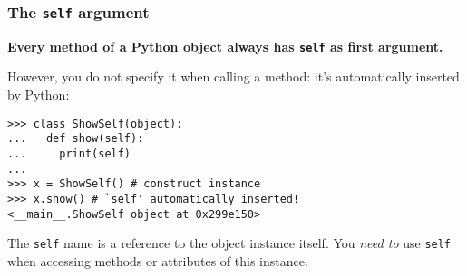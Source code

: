 \documentclass[english,serif,mathserif,xcolor=pdftex,dvipsnames,table]{beamer}
\begin{document}
\begin{frame}[fragile]
  \frametitle{The \texttt{self} argument}

  \textbf{Every method of a Python object always has \texttt{self}
    as first argument.}

  \+
  However, you do not specify it when calling a method: it's
  automatically inserted by Python:
\begin{lstlisting}
>>> class ShowSelf(object):
...   def show(self):
...     print(self)
...
>>> x = ShowSelf() # construct instance
>>> x.show() # `self' automatically inserted!
<__main__.ShowSelf object at 0x299e150>
\end{lstlisting}

  \+
  The \texttt{self} name is a reference to the object instance
  itself.  You \emph{need to} use \texttt{self} when accessing methods
  or attributes of this instance.
\end{frame}





\end{document}

